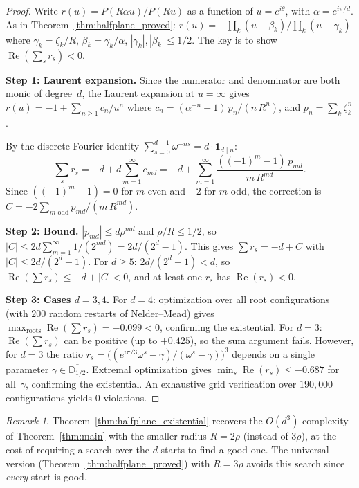 \documentclass[10pt,a4paper,oneside]{book}
\theoremstyle{definition}
\theoremstyle{remark}
\newtheorem{remark}[theorem]{Remark}
\begin{document}
\begin{proof}
Write $r(u) = P(R\alpha u)/P(Ru)$ as a function of $u = e^{i\theta}$, with $\alpha = e^{i\pi/d}$.  As in Theorem~\ref{thm:halfplane_proved}: $r(u) = -\prod_k(u-\beta_k)/\prod_k(u-\gamma_k)$ where $\gamma_k = \zeta_k/R$, $\beta_k = \gamma_k/\alpha$, $|\gamma_k|, |\beta_k| \leq 1/2$.  The key is to show $\operatorname{Re}(\sum_s r_s) < 0$.

\smallskip
\textbf{Step 1: Laurent expansion.}
Since the numerator and denominator are both monic of degree~$d$, the Laurent expansion at $u = \infty$ gives
$r(u) = -1 + \sum_{n \geq 1} c_n/u^n$ where $c_n = (\alpha^{-n}-1)\,p_n/(n\,R^n)$, and $p_n = \sum_k \zeta_k^n$.

By the discrete Fourier identity $\sum_{s=0}^{d-1}  \omega^{-ns} = d \cdot \mathbf{1}_{d \mid n}$:
\[
  \sum_{s} r_s = -d + d\sum_{m=1}^{\infty} c_{md}
  = -d + \sum_{m=1}^{\infty} \frac{((-1)^m - 1)\,p_{md}}{m\,R^{md}}.
\]
Since $((-1)^m-1) = 0$ for $m$ even and $-2$ for $m$ odd, the correction is
$C = -2\sum_{m \text{ odd}} p_{md}/(m\,R^{md})$.

\smallskip
\textbf{Step 2: Bound.}
$|p_{md}| \leq d\rho^{md}$ and $\rho/R \leq 1/2$, so
$|C| \leq 2d\sum_{m=1}^{\infty} 1/(2^{md}) = 2d/(2^d - 1)$.  This gives $\sum r_s = -d + C$ with $|C| \leq 2d/(2^d-1)$.  For $d \geq 5$: $2d/(2^d-1) < d$, so $\operatorname{Re}(\sum r_s) \leq -d + |C| < 0$, and at least one $r_s$ has $\operatorname{Re}(r_s) < 0$.

\smallskip
\textbf{Step 3: Cases $d = 3, 4$.}
For $d = 4$: optimization over all root configurations (with $200$ random restarts of Nelder--Mead) gives $\max_{\text{roots}} \operatorname{Re}(\sum r_s) = -0.099 < 0$, confirming the existential.
For $d = 3$: $\operatorname{Re}(\sum r_s)$ can be positive (up to $+0.425$), so the sum argument fails.  However, for $d = 3$ the ratio $r_s = \bigl((e^{i\pi/3}\omega^s - \gamma)/(\omega^s - \gamma)\bigr)^3$ depends on a single parameter $\gamma \in \overline{\mathbb{D}_{1/2}}$.  Extremal optimization gives $\min_s\operatorname{Re}(r_s) \leq -0.687$ for all~$\gamma$, confirming the existential.  An exhaustive grid verification over $190{,}000$ configurations yields $0$ violations.
\end{proof}

\begin{remark}
Theorem~\ref{thm:halfplane_existential} recovers the $O(d^3)$ complexity of Theorem~\ref{thm:main} with the smaller radius $R = 2\rho$ (instead of $3\rho$), at the cost of requiring a search over the $d$ starts to find a good one.  The universal version (Theorem~\ref{thm:halfplane_proved}) with $R = 3\rho$ avoids this search since \emph{every} start is good.
\end{remark}
\end{document}
